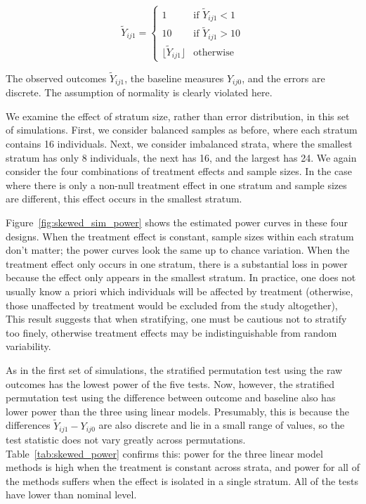 \documentclass[11pt]{article}
\begin{document}
\begin{displaymath}
   \tilde{Y}_{ij1} = \left\{
     \begin{array}{ll}
       1 & \text{if } \tilde{Y}_{ij1} < 1\\
       10 & \text{if } \tilde{Y}_{ij1} > 10 \\
       \lfloor \tilde{Y}_{ij1} \rfloor & \text{otherwise}
     \end{array}
   \right.
\end{displaymath}

The observed outcomes $\tilde{Y}_{ij1}$, the baseline measures $Y_{ij0}$, and the errors are discrete.
The assumption of normality is clearly violated here.

We examine the effect of stratum size, rather than error distribution, in this set of simulations.
First, we consider balanced samples as before, where each stratum contains 16 individuals.
Next, we consider imbalanced strata, where the smallest stratum has only 8 individuals, the next has 16, and the largest has 24.
We again consider the four combinations of treatment effects and sample sizes.
In the case where there is only a non-null treatment effect in one stratum and sample sizes are different, this effect occurs in the smallest stratum.

Figure~\ref{fig:skewed_sim_power} shows the estimated power curves in these four designs.
When the treatment effect is constant, sample sizes within each stratum don't matter; the power curves look the same up to chance variation.
When the treatment effect only occurs in one stratum, there is a substantial loss in power because the effect only appears in the smallest stratum.
In practice, one does not usually know a priori which individuals will be affected by treatment (otherwise, those unaffected by treatment would be excluded from the study altogether),
This result suggests that when stratifying, one must be cautious not to stratify too finely, otherwise treatment effects may be indistinguishable from random variability.

As in the first set of simulations, the stratified permutation test using the raw outcomes has the lowest power of the five tests.
Now, however, the stratified permutation test using the difference between outcome and baseline also has lower power than the three using linear models.
Presumably, this is because the differences $\tilde{Y}_{ij1} - Y_{ij0}$ are also discrete and lie in a small range of values, so the test statistic does not vary greatly across permutations.
Table~\ref{tab:skewed_power} confirms this: power for the three linear model methods is high when the treatment is constant across strata, and power for all of the methods suffers when the effect is isolated in a single stratum.
All of the tests have lower than nominal level.
\end{document}
